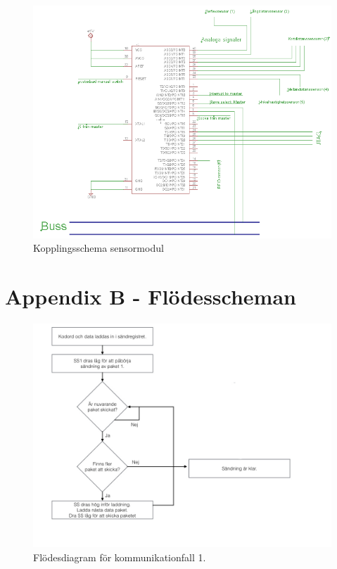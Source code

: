 \documentclass[a4paper,12pt,fleqn]{article}
\begin{document}
\begin{figure}[ht] %
  \begin{center}
  \includegraphics[keepaspectratio=true,width=\linewidth]{bilder/sensormodulkoppling.png}  %
  \end{center}
  \caption{Kopplingsschema sensormodul} %
  \label{fig:kopplingsensor} %
\end{figure}
 \clearpage %
 

\newpage
\section*{Appendix B - Flödesscheman}

\begin{figure}[htp] %
  \begin{center}
  \includegraphics[keepaspectratio=true,width=\linewidth]{bilder/SPIbild002.jpg}  %
  \end{center}
  \caption{Flödesdiagram för kommunikationfall 1.} %
  \label{fig:case1flow}
\end{figure}
\end{document}

